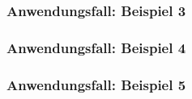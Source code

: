 \documentclass[enabledeprecatedfontcommands,fontsize=12pt,paper=a4,twoside]{scrartcl}
\begin{document}

\subsubsection{Anwendungsfall: Beispiel 3}


\subsubsection{Anwendungsfall: Beispiel 4}


\subsubsection{Anwendungsfall: Beispiel 5}

\end{document}

